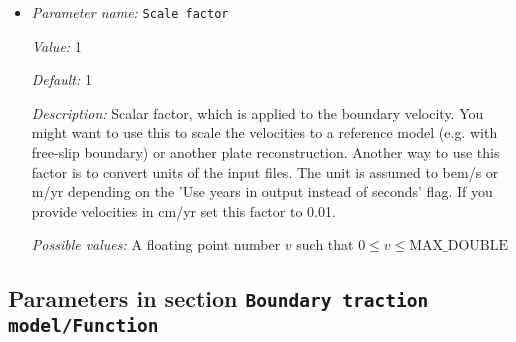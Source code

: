 \begin{itemize}
{\it Possible values:} An integer $n$ such that $-2147483648\leq n \leq 2147483647$
\item {\it Parameter name:} {\tt Scale factor}
\label{parameters:Boundary traction model/Ascii data model/Scale factor}


{\it Value:} 1


{\it Default:} 1


{\it Description:} Scalar factor, which is applied to the boundary velocity. You might want to use this to scale the velocities to a reference model (e.g. with free-slip boundary) or another plate reconstruction. Another way to use this factor is to convert units of the input files. The unit is assumed to bem/s or m/yr depending on the 'Use years in output instead of seconds' flag. If you provide velocities in cm/yr set this factor to 0.01.


{\it Possible values:} A floating point number $v$ such that $0 \leq v \leq \text{MAX\_DOUBLE}$
\end{itemize}

\subsection{Parameters in section \tt Boundary traction model/Function}
\label{parameters:Boundary_20traction_20model/Function}

